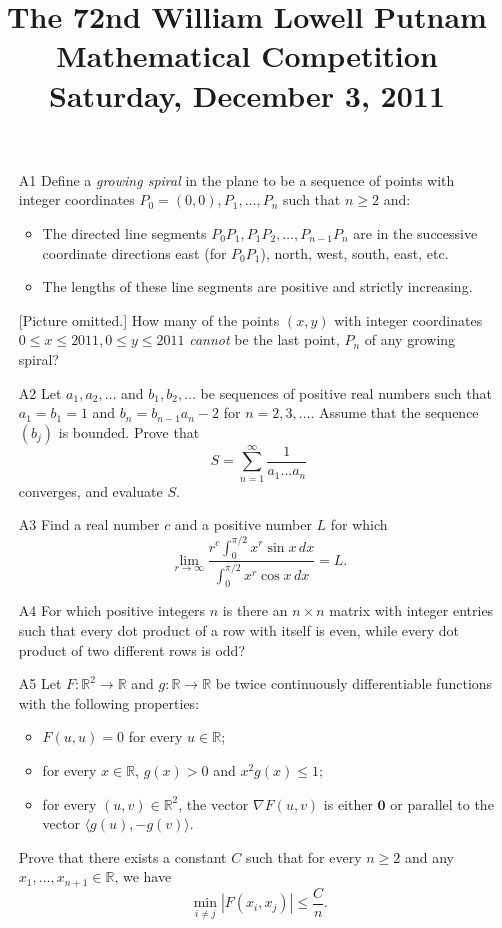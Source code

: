 \documentclass[amssymb,twocolumn]{revtex4}
\begin{document}
\title{The 72nd William Lowell Putnam Mathematical Competition \\
    Saturday, December 3, 2011}
\maketitle

\newcommand{\RR}{\mathbb{R}}

\begin{itemize}

\item[A1]
Define a \textit{growing spiral} in the plane to be a sequence of points with integer coordinates $P_0 = (0,0), P_1, \dots, P_n$ such that $n \geq 2$ and:
\begin{itemize}
\item
The directed line segments $P_0 P_1, P_1 P_2, \dots, P_{n-1} P_n$ are in the successive coordinate directions east (for $P_0 P_1$), north, west, south, east, etc.
\item
The lengths of these line segments are positive and strictly increasing.
\end{itemize}
[Picture omitted.]
How many of the points $(x,y)$ with integer coordinates $0\leq x\leq 2011, 0\leq y\leq 2011$ \emph{cannot} be the last point, $P_n$ of any growing spiral?

\item[A2]
Let $a_1,a_2,\dots$ and $b_1,b_2,\dots$ be sequences of positive real numbers such that $a_1 = b_1 = 1$ and $b_n = b_{n-1} a_n - 2$ for $n=2,3,\dots$. Assume that the sequence $(b_j)$ is bounded. Prove that 
\[
S = \sum_{n=1}^\infty \frac{1}{a_1...a_n}
\]
converges, and evaluate $S$.

\item[A3]
Find a real number $c$ and a positive number $L$ for which
\[
\lim_{r\to\infty} \frac{r^c \int_0^{\pi/2} x^r \sin x \,dx}{\int_0^{\pi/2} x^r \cos x \,dx} = L.
\]

\item[A4]
For which positive integers $n$ is there an $n \times n$ matrix with integer entries such that every dot product of a row with itself is even, while every dot product of two different rows is odd?

\item[A5]
Let $F : \RR^2 \to \RR$ and $g : \RR \to \RR$ be twice continuously differentiable functions with the following properties:
\begin{itemize}
\item $F(u,u) = 0$ for every $u \in \RR$;
\item for every $x \in \RR$, $g(x) > 0$ and $x^2 g(x) \leq 1$;
\item for every $(u,v) \in \RR^2$, the vector $\nabla F(u,v)$ is either $\mathbf{0}$ or parallel to the vector $\langle g(u), -g(v) \rangle$.
\end{itemize}
Prove that there exists a constant $C$ such that for every $n\geq 2$ and any $x_1,\dots,x_{n+1} \in \RR$, we have
\[
\min_{i \neq j} |F(x_i,x_j)| \leq \frac{C}{n}.
\]


\end{itemize}
\end{document}
